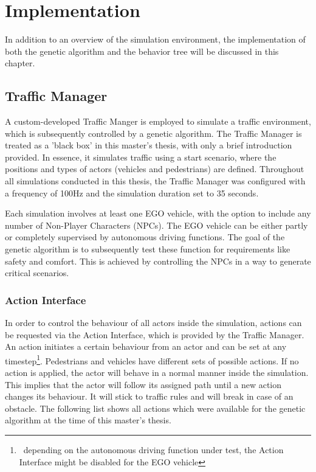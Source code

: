 \chapter{Implementation}
\label{chap:implementation}

In addition to an overview of the simulation environment, the implementation of both the genetic algorithm and the behavior tree will be discussed in this chapter.

\section{Traffic Manager}
A custom-developed Traffic Manger is employed to simulate a traffic environment, which is subsequently controlled by a genetic algorithm. The Traffic Manager is treated as a 'black box' in this master's thesis, with only a brief introduction provided. In essence, it simulates traffic using a start scenario, where the positions and types of actors (vehicles and pedestrians) are defined. Throughout all simulations conducted in this thesis, the Traffic Manager was configured with a frequency of 100Hz and the simulation duration set to 35 seconds.

Each simulation involves at least one EGO vehicle, with the option to include any number of Non-Player Characters (NPCs). The EGO vehicle can be either partly or completely supervised by autonomous driving functions. The goal of the genetic algorithm is to subsequently test these function for requirements like safety and comfort. This is achieved by controlling the NPCs in a way to generate critical scenarios.

\subsection{Action Interface}
\label{sect:implementation:action_interface}
In order to control the behaviour of all actors inside the simulation, actions can be requested via the Action Interface, which is provided by the Traffic Manager. An action initiates a certain behaviour from an actor and can be set at any timestep\footnote{~depending on the autonomous driving function under test, the Action Interface might be disabled for the EGO vehicle}. Pedestrians and vehicles have different sets of possible actions. If no action is applied, the actor will behave in a normal manner inside the simulation. This implies that the actor will follow its assigned path until a new action changes its behaviour. It will stick to traffic rules and will break in case of an obstacle. The following list shows all actions which were available for the genetic algorithm at the time of this master's thesis.

